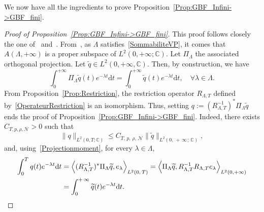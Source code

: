 \documentclass[AHL,Unicode,longabstracts]{cedram}
\newcommand{\NN}{\mathcal{N}}
\newcommand{\C}{\mathbb{C}}
\newcommand{\lag}{\langle}
\newcommand{\rag}{\rangle}
\newcommand{\md}{\mathrm{d}}
\let\oldforall\forall
\renewcommand*{\forall}{\mathrel{\oldforall}}
\begin{document}
We now have all the ingredients to prove Proposition~\ref{Prop:GBF_Infini->GBF_fini}.




\begin{proof}[Proof of Proposition~\ref{Prop:GBF_Infini->GBF_fini}]
This proof follows closely the one of~\cite[Section~4]{AKBGBDT_Kalman} and~\cite[Lemma~4.2]{AmmarKhodjaBenabdallahGonzalez-BurgosdeTeresa:2014}. From~\cite[Corollary~4.3]{AKBGBDT_Kalman}, as $\Lambda$ satisfies~\eqref{SommabiliteVP}, it comes that $A(\Lambda, +\infty)$ is a proper subspace of $L^2(0, +\infty ; \C)$. Let $\Pi_\Lambda$ the associated orthogonal projection. Let $\widetilde{q} \in L^2(0,+\infty, \C)$. Then, by construction, we have
\begin{equation}\label{Projectionmoment}
\int_0^{+\infty} \Pi_\Lambda \widetilde{q}(t) e^{-\lambda t} \md t = \int_0^{+\infty} \widetilde{q}(t) e^{-\lambda t} \md t,
\quad \forall \lambda\in \Lambda.
\end{equation}
From Proposition~\ref{Prop:Restriction}, the restriction operator $R_{\Lambda,T}$ defined by~\eqref{OperateurRestriction} is an isomorphism. Thus, setting $q := (R_{\Lambda,T}^{-1})^* \Pi_\Lambda \widetilde{q}$ ends the proof of Proposition~\ref{Prop:GBF_Infini->GBF_fini}. Indeed, there exists $C_{T,p,\rho,\NN}>0$ such that
\[
\| q \|_{L^2(0,T ; \C)} \leq C_{T,\,p,\,\rho,\,\NN} \| \widetilde{q} \|_{L^2(0,\,+\,\infty\,;\, \C)},
\]
and, using~\eqref{Projectionmoment}, for every $\lambda\in \Lambda$,
\begin{align*}
\int_0^T q(t) e^{-\lambda t} \md t &= \left\lag (R_{\Lambda,T}^{-1})^* \Pi_\Lambda\widetilde{q}, e_\lambda \right\rag_{L^2(0,\,T)} = \left\lag \Pi_\Lambda\widetilde{q}, R_{\Lambda,T}^{-1} R_{\Lambda,T} e_\lambda \right\rag_{L^2(0,+\infty)}
\\
&= \int_0^{+\,\infty} \widetilde{q}(t) e^{-\lambda t} \md t.\qedhere
\end{align*}
\end{proof}
\end{document}
